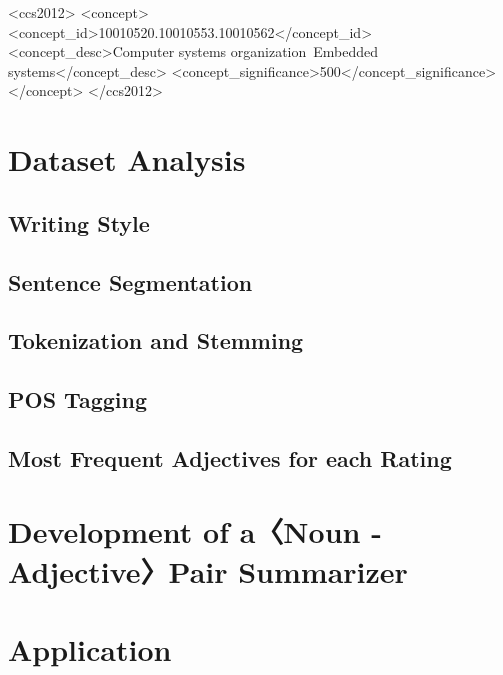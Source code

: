 \documentclass[sigchi]{acmart}
\begin{document}
	\begin{CCSXML}
		<ccs2012>
		<concept>
		<concept_id>10010520.10010553.10010562</concept_id>
		<concept_desc>Computer systems organization~Embedded systems</concept_desc>
		<concept_significance>500</concept_significance>
		</concept>
		</ccs2012>
	\end{CCSXML}
	

	
	
	
	\maketitle
	
	\section{Dataset Analysis}
	\subsection{Writing Style}
	\subsection{Sentence Segmentation}
	
	\subsection{Tokenization and Stemming}
	\subsection{POS Tagging}
	\subsection{Most Frequent Adjectives for each Rating}
	\section{Development of a〈Noun - Adjective〉Pair Summarizer}
	
	\section{Application}
	
\end{document}

